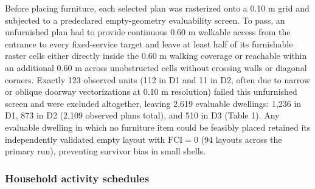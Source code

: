 \documentclass[12pt,letterpaper]{article}
\begin{document}
Before placing furniture, each selected plan was rasterized onto a 0.10 m grid and subjected to a predeclared empty-geometry evaluability screen. To pass, an unfurnished plan had to provide continuous 0.60 m walkable access from the entrance to every fixed-service target and leave at least half of its furnishable raster cells either directly inside the 0.60 m walking coverage or reachable within an additional 0.60 m across unobstructed cells without crossing walls or diagonal corners. Exactly 123 observed units (112 in D1 and 11 in D2, often due to narrow or oblique doorway vectorizations at 0.10 m resolution) failed this unfurnished screen and were excluded altogether, leaving 2,619 evaluable dwellings: 1,236 in D1, 873 in D2 (2,109 observed plans total), and 510 in D3 (Table 1). Any evaluable dwelling in which no furniture item could be feasibly placed retained its independently validated empty layout with \(\text{FCI} = 0\) (94 layouts across the primary run), preventing survivor bias in small shells.

\subsubsection{Household activity schedules}\label{household-activity-schedules}
\end{document}
